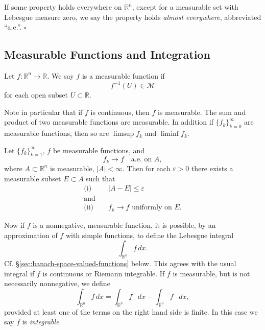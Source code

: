\begin{definition}
\label{def:almost-everywhere}
If some property holds everywhere on $\mathbb{R}^n$, except for a measurable set with Lebesgue measure zero, we say the property holds \textit{almost everywhere}, abbreviated ``a.e.''. $\square$
\end{definition}

\subsection{Measurable Functions and Integration}
\label{sec:measurable-functions-integration}

\begin{definition}
\label{def:measurable-function}
Let $f : \mathbb{R}^n \to \mathbb{R}$. We say $f$ is a measurable function if
$$f^{-1}(U) \in \mathcal{M}$$
for each open subset $U \subset \mathbb{R}$.
\end{definition}

Note in particular that if $f$ is continuous, then $f$ is measurable. The sum and product of two measurable functions are measurable. In addition if $\{f_k\}_{k=0}^{\infty}$ are measurable functions, then so are $\limsup f_k$ and $\liminf f_k$.

\begin{theorem}
\label{thm:egoroffs-theorem}
Let $\{f_k\}_{k=1}^{\infty}$, $f$ be measurable functions, and
$$f_k \to f \quad \text{a.e. on } A,$$
where $A \subset \mathbb{R}^n$ is measurable, $|A| < \infty$. Then for each $\varepsilon > 0$ there exists a measurable subset $E \subset A$ such that
\begin{align*}
\text{(i)} & \quad |A - E| \le \varepsilon \\
\text{and} \\
\text{(ii)} & \quad f_k \to f \text{ uniformly on } E.
\end{align*}
\end{theorem}

Now if $f$ is a nonnegative, measurable function, it is possible, by an approximation of $f$ with simple functions, to define the Lebesgue integral
$$\int_{\mathbb{R}^n} f \, dx.$$
Cf. \S\ref{sec:banach-space-valued-functions} below. This agrees with the usual integral if $f$ is continuous or Riemann integrable. If $f$ is measurable, but is not necessarily nonnegative, we define
$$\int_{\mathbb{R}^n} f \, dx = \int_{\mathbb{R}^n} f^+ \, dx - \int_{\mathbb{R}^n} f^- \, dx,$$
provided at least one of the terms on the right hand side is finite. In this case we say $f$ is \textit{integrable}.

